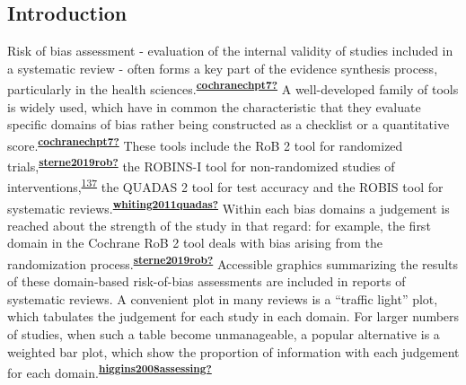 \documentclass[a4paper, twoside]{templates/ociamthesis}
\begin{document}
\hypertarget{introduction-4}{%
\subsection{Introduction}\label{introduction-4}}

Risk of bias assessment - evaluation of the internal validity of studies included in a systematic review - often forms a key part of the evidence synthesis process, particularly in the health sciences.\textsuperscript{\protect\hyperlink{ref-cochranechpt7}{\textbf{cochranechpt7?}}} A well-developed family of tools is widely used, which have in common the characteristic that they evaluate specific domains of bias rather being constructed as a checklist or a quantitative score.\textsuperscript{\protect\hyperlink{ref-cochranechpt7}{\textbf{cochranechpt7?}}} These tools include the RoB 2 tool for randomized trials,\textsuperscript{\protect\hyperlink{ref-sterne2019rob}{\textbf{sterne2019rob?}}} the ROBINS-I tool for non-randomized studies of interventions,\textsuperscript{\protect\hyperlink{ref-sterne2016}{137}} the QUADAS 2 tool for test accuracy and the ROBIS tool for systematic reviews.\textsuperscript{\protect\hyperlink{ref-whiting2011quadas}{\textbf{whiting2011quadas?}}} Within each bias domains a judgement is reached about the strength of the study in that regard: for example, the first domain in the Cochrane RoB 2 tool deals with bias arising from the randomization process.\textsuperscript{\protect\hyperlink{ref-sterne2019rob}{\textbf{sterne2019rob?}}} Accessible graphics summarizing the results of these domain-based risk-of-bias assessments are included in reports of systematic reviews. A convenient plot in many reviews is a ``traffic light'' plot, which tabulates the judgement for each study in each domain. For larger numbers of studies, when such a table become unmanageable, a popular alternative is a weighted bar plot, which show the proportion of information with each judgement for each domain.\textsuperscript{\protect\hyperlink{ref-higgins2008assessing}{\textbf{higgins2008assessing?}}}
\end{document}
